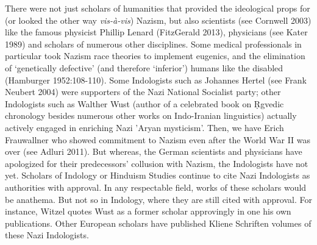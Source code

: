 There were not just scholars of humanities that provided the ideological props for (or looked the other way \textit{vis-à-vis}) Nazism, but also scientists (see Cornwell 2003) like the famous physicist Phillip Lenard (FitzGerald 2013), physicians (see Kater 1989) and scholars of numerous other disciplines. Some medical professionals in particular took Nazism race theories to implement eugenics, and the elimination of ‘genetically defective’ (and therefore ‘inferior’) humans like the disabled (Hamburger 1952:108-110). Some Indologists such as Johannes Hertel (see Frank Neubert 2004) were supporters of the Nazi National Socialist party; other Indologists such as Walther Wust (author of a celebrated book on Ṛgvedic chronology besides numerous other works on Indo-Iranian linguistics) actually actively engaged in enriching Nazi 'Aryan mysticism'. Then, we have Erich Frauwallner who showed commitment to Nazism even after the World War II was over (see Adluri 2011). But whereas, the German scientists and physicians have apologized for their predecessors’ collusion with Nazism, the Indologists have not yet. Scholars of Indology or Hinduism Studies continue to cite Nazi Indologists as authorities with approval. In any respectable field, works of these scholars would be anathema. But not so in Indology, where they are still cited with approval. For instance, Witzel quotes Wust as a former scholar approvingly in one his own publications. Other European scholars have published Kliene Schriften volumes of these Nazi Indologists.

